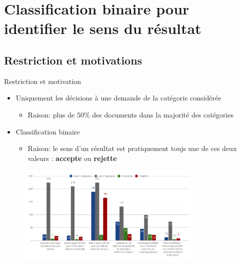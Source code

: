 \documentclass[newPxFont,pagenumber]{beamer}
\begin{document}

\section{Classification binaire pour identifier le sens du résultat}

\subsection{Restriction et motivations}
\begin{frame}{Restriction et motivation}
\begin{itemize}
\item Uniquement les décisions à une demande de la catégorie considérée
\begin{itemize}
\item Raison: plus de $50\%$ des documents dans la majorité des catégories
\end{itemize}
\item Classification binaire
\begin{itemize}
\item Raison: le sens d'un résultat est pratiquement toujs une de ces deux valeurs : \textbf{accepte} ou \textbf{rejette}
\end{itemize}
\end{itemize}
\begin{figure}
\includegraphics[width=0.8\textwidth]{chartDataset1dmd.png}
\end{figure}
\end{frame}

%
\end{document}
